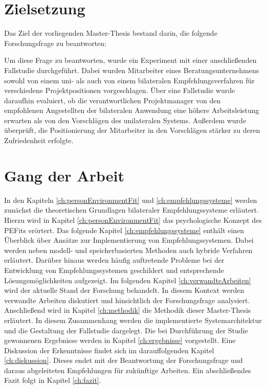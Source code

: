 \newpage
\section{Zielsetzung}
\label{sec:intro:zielsetzung}
Das Ziel der vorliegenden Master-Thesis bestand darin, die folgende Forschungsfrage zu beantworten:

\forschungsfrage

Um diese Frage zu beantworten, wurde ein Experiment mit einer anschließenden Fallstudie durchgeführt. Dabei wurden Mitarbeiter eines Beratungsunternehmens sowohl von einem uni- als auch von einem bilateralen Empfehlungsverfahren für verschiedene Projektpositionen vorgeschlagen. Über eine Fallstudie wurde daraufhin evaluiert, ob die verantwortlichen Projektmanager von den empfohlenen Angestellten der bilateralen Anwendung eine höhere Arbeitsleistung erwarten als von den Vorschlägen des unilateralen Systems. Außerdem wurde überprüft, die Positionierung der Mitarbeiter in den Vorschlägen stärker zu deren Zufriedenheit erfolgte.

\section{Gang der Arbeit}
\label{sec:intro:gangDerArbeit}
In den Kapiteln \ref{ch:personEnvironmentFit} und \ref{ch:empfehlungssysteme} werden zunächst die theoretischen Grundlagen bilateraler Empfehlungssysteme erläutert. Hierzu wird in Kapitel \ref{ch:personEnvironmentFit} das psychologische Konzept des \acp{PEFit} erörtert. Das folgende Kapitel \ref{ch:empfehlungssysteme} enthält einen Überblick über Ansätze zur Implementierung von Empfehlungssystemen. Dabei werden neben modell- und speicherbasierten Methoden auch hybride Verfahren erläutert. Darüber hinaus werden häufig auftretende Probleme bei der Entwicklung von Empfehlungssystemen geschildert und entsprechende Lösungsmöglichkeiten aufgezeigt. Im folgenden Kapitel \ref{ch:verwandteArbeiten} wird der aktuelle Stand der Forschung behandelt. In diesem Kontext werden verwandte Arbeiten diskutiert und hinsichtlich der Forschungsfrage analysiert. Anschließend wird in Kapitel \ref{ch:methodik} die Methodik dieser Master-Thesis erläutert. In diesem Zusammenhang werden die implementierte Systemarchitektur und die Gestaltung der Fallstudie dargelegt. Die bei Durchführung der Studie gewonnenen Ergebnisse werden in Kapitel \ref{ch:ergebnisse} vorgestellt. Eine Diskussion der Erkenntnisse findet sich im darauffolgenden Kapitel \ref{ch:diskussion}. Dieses endet mit der Beantwortung der Forschungsfrage und daraus abgeleiteten Empfehlungen für zukünftige Arbeiten. Ein abschließendes Fazit folgt in Kapitel \ref{ch:fazit}.
